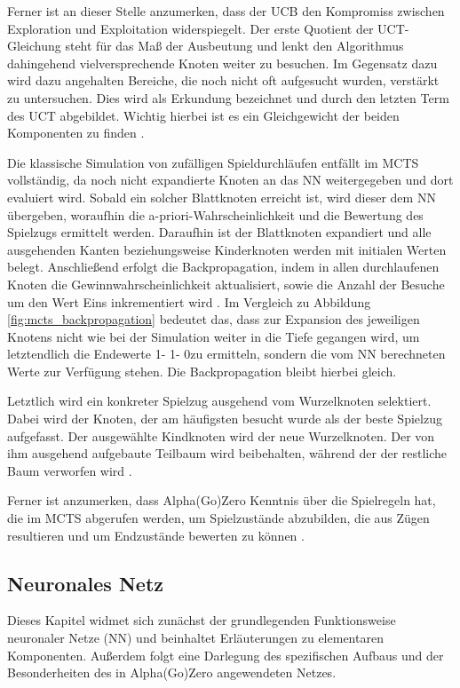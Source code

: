 \documentclass[12pt,a4paper]{article}
\begin{document}
Ferner ist an dieser Stelle anzumerken, dass der UCB den Kompromiss zwischen Exploration und Exploitation widerspiegelt. Der erste Quotient der UCT-Gleichung steht für das Maß der Ausbeutung und lenkt den Algorithmus dahingehend vielversprechende Knoten weiter zu besuchen. Im Gegensatz dazu wird dazu angehalten Bereiche, die noch nicht oft aufgesucht wurden, verstärkt zu untersuchen. Dies wird als Erkundung bezeichnet und durch den letzten Term des UCT abgebildet. Wichtig hierbei ist es ein Gleichgewicht der beiden Komponenten zu finden \cite{Browne2012}.

Die klassische Simulation von zufälligen Spieldurchläufen entfällt im MCTS vollständig, da noch nicht expandierte Knoten an das NN weitergegeben und dort evaluiert wird. Sobald ein solcher Blattknoten erreicht ist, wird dieser dem NN übergeben, woraufhin die a-priori-Wahrscheinlichkeit und die Bewertung des Spielzugs ermittelt werden. Daraufhin ist der Blattknoten expandiert und alle ausgehenden Kanten beziehungsweise Kinderknoten werden mit initialen Werten belegt.
Anschließend erfolgt die Backpropagation, indem in allen durchlaufenen Knoten die Gewinnwahrscheinlichkeit aktualisiert, sowie die Anzahl der Besuche um den Wert Eins inkrementiert wird \cite{Silver2017}. Im Vergleich zu Abbildung \ref{fig:mcts_backpropagation} bedeutet das, dass zur Expansion des jeweiligen Knotens nicht wie bei der Simulation weiter in die Tiefe gegangen wird, um letztendlich die Endewerte \glqq{}1\grqq - \glqq{}1\grqq - \glqq{}0\grqq zu ermitteln, sondern die vom NN berechneten Werte zur Verfügung stehen. Die Backpropagation bleibt hierbei gleich.

Letztlich wird ein konkreter Spielzug ausgehend vom Wurzelknoten selektiert. Dabei wird der Knoten, der am häufigsten besucht wurde als der beste Spielzug aufgefasst. Der ausgewählte Kindknoten wird der neue Wurzelknoten. Der von ihm ausgehend aufgebaute Teilbaum wird beibehalten, während der der restliche Baum verworfen wird \cite{Silver2017}.

Ferner ist anzumerken, dass Alpha(Go)Zero Kenntnis über die Spielregeln hat, die im MCTS abgerufen werden, um Spielzustände abzubilden, die aus Zügen resultieren und um Endzustände bewerten zu können \cite{Silver2017} \cite{SilverHubert2017}. 

\newpage
\subsection{Neuronales Netz}
Dieses Kapitel widmet sich zunächst der grundlegenden Funktionsweise neuronaler Netze (NN) und beinhaltet Erläuterungen zu elementaren Komponenten. Außerdem folgt eine Darlegung des spezifischen Aufbaus und der Besonderheiten des in Alpha(Go)Zero angewendeten Netzes.
\end{document}
